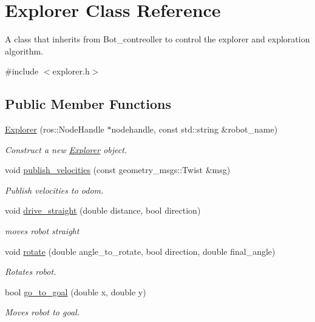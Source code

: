 \hypertarget{class_explorer}{}\section{Explorer Class Reference}
\label{class_explorer}


A class that inherits from Bot\+\_\+contreoller to control the explorer and exploration algorithm.  




{\ttfamily \#include $<$explorer.\+h$>$}

\subsection*{Public Member Functions}
\begin{DoxyCompactItemize}
\item 
\hyperlink{class_explorer_aafe6b7c3b9c2e24815aa14a731f31890}{Explorer} (ros\+::\+Node\+Handle $\ast$nodehandle, const std\+::string \&robot\+\_\+name)
\begin{DoxyCompactList}\small\item\em Construct a new \hyperlink{class_explorer}{Explorer} object. \end{DoxyCompactList}\item 
void \hyperlink{class_explorer_a8ffef25585ef957b9df4407366723787}{publish\+\_\+velocities} (const geometry\+\_\+msgs\+::\+Twist \&msg)
\begin{DoxyCompactList}\small\item\em Publish velocities to odom. \end{DoxyCompactList}\item 
void \hyperlink{class_explorer_ab4ca9f16c48a60fc4d0e426b6fd9e9a0}{drive\+\_\+straight} (double distance, bool direction)
\begin{DoxyCompactList}\small\item\em moves robot straight \end{DoxyCompactList}\item 
void \hyperlink{class_explorer_ac8e3a980fd3929734fb3a4b0b2e0a7e0}{rotate} (double angle\+\_\+to\+\_\+rotate, bool direction, double final\+\_\+angle)
\begin{DoxyCompactList}\small\item\em Rotates robot. \end{DoxyCompactList}\item 
bool \hyperlink{class_explorer_aa1e259feaac1114adb0f24588428e8ef}{go\+\_\+to\+\_\+goal} (double x, double y)
\begin{DoxyCompactList}\small\item\em Moves robot to goal. \end{DoxyCompactList}\item 

\end{DoxyCompactItemize}
